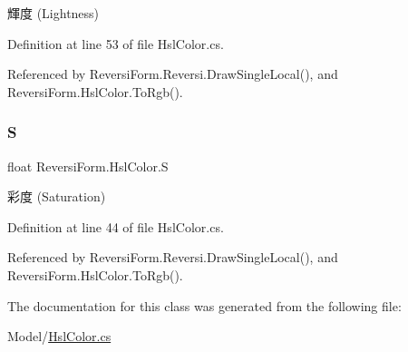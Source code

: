 輝度 (Lightness) 



Definition at line 53 of file Hsl\+Color.\+cs.



Referenced by Reversi\+Form.\+Reversi.\+Draw\+Single\+Local(), and Reversi\+Form.\+Hsl\+Color.\+To\+Rgb().

\mbox{\label{class_reversi_form_1_1_hsl_color_a0f9af27b3dee665ad51966d71e06c578}} 
\subsubsection{\texorpdfstring{S}{S}}
{\footnotesize\ttfamily float Reversi\+Form.\+Hsl\+Color.\+S\hspace{0.3cm}{\ttfamily [get]}}



彩度 (Saturation) 



Definition at line 44 of file Hsl\+Color.\+cs.



Referenced by Reversi\+Form.\+Reversi.\+Draw\+Single\+Local(), and Reversi\+Form.\+Hsl\+Color.\+To\+Rgb().



The documentation for this class was generated from the following file\+:\begin{DoxyCompactItemize}
\item 
Model/\hyperlink{_hsl_color_8cs}{Hsl\+Color.\+cs}\end{DoxyCompactItemize}
